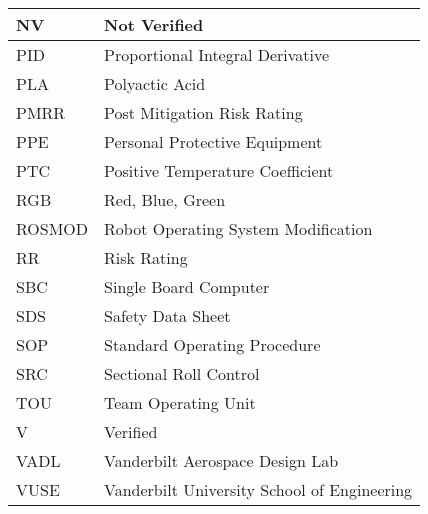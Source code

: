 \documentclass[class=article, crop=false]{standalone}
\begin{document}
\begin{table}[H]
\begin{tabular}{|l|l|}
NV      & Not Verified                                      \\ \hline
PID     & Proportional Integral Derivative                  \\ \hline
PLA     & Polyactic Acid                                    \\ \hline
PMRR    & Post Mitigation Risk Rating                       \\ \hline
PPE     & Personal Protective Equipment                     \\ \hline
PTC     & Positive Temperature Coefficient                  \\ \hline
RGB     & Red, Blue, Green                                  \\ \hline
ROSMOD  & Robot Operating System Modification               \\ \hline
RR      & Risk Rating                                       \\ \hline
SBC     & Single Board Computer                             \\ \hline
SDS     & Safety Data Sheet                                 \\ \hline
SOP     & Standard Operating Procedure                      \\ \hline
SRC     & Sectional Roll Control                            \\ \hline
TOU     & Team Operating Unit                               \\ \hline
V       & Verified                                          \\ \hline
VADL    & Vanderbilt Aerospace Design Lab                   \\ \hline
VUSE    & Vanderbilt University School of Engineering       \\ \hline
\end{tabular}
\end{table}
\end{document}
